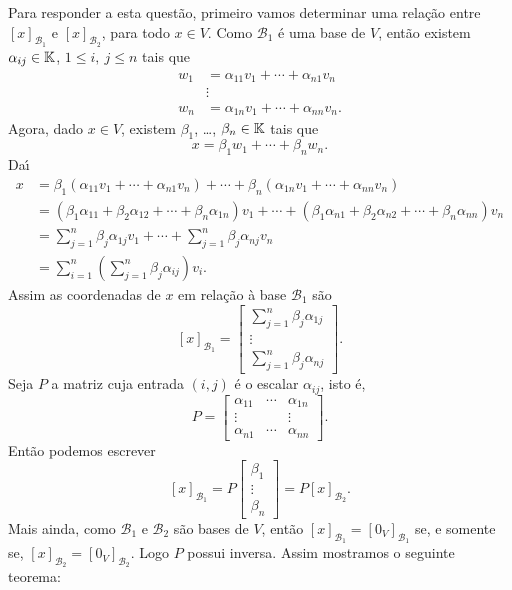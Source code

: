 Para responder a esta quest\~ao, primeiro vamos determinar uma rela\c{c}\~ao entre $[x]_{\mathcal{B}_1}$ e $[x]_{\mathcal{B}_2}$, para todo $x \in V$. Como $\mathcal{B}_1$ \'e uma base de $V$, ent\~ao existem $\alpha_{ij} \in \mathbb{K}$, $1 \le i,\ j \le n$ tais que
\begin{align*}
	w_1 &= \alpha_{11}v_1 + \cdots + \alpha_{n1}v_n\\
	&\vdots\\
	w_n &= \alpha_{1n}v_1 + \cdots + \alpha_{nn}v_n.
\end{align*}
Agora, dado $x \in V$, existem $\beta_1$, \dots, $\beta_n \in \mathbb{K}$ tais que
\[
	x = \beta_1w_1 + \cdots + \beta_nw_n.
\]
Da{\'\i}
\begin{align*}
	x &= \beta_1(\alpha_{11}v_1 + \cdots + \alpha_{n1}v_n) + \cdots + \beta_n(\alpha_{1n}v_1 + \cdots + \alpha_{nn}v_n)\\
	&= (\beta_1\alpha_{11} + \beta_2\alpha_{12} + \cdots + \beta_n\alpha_{1n})v_1 + \cdots + (\beta_1\alpha_{n1} + \beta_2\alpha_{n2} + \cdots + \beta_n\alpha_{nn})v_n\\
	&= \sum_{j=1}^n\beta_j\alpha_{1j}v_1 + \cdots + \sum_{j=1}^n\beta_j\alpha_{nj}v_n\\
	&= \sum_{i=1}^n\left(\sum_{j=1}^n\beta_j\alpha_{ij}\right)v_i.
\end{align*}
Assim as coordenadas de $x$ em rela\c{c}\~ao \`a base $\mathcal{B}_1$ s\~ao
\[
	[x]_{\mathcal{B}_1} = \begin{bmatrix}
		\sum_{j=1}^n\beta_j\alpha_{1j}\\
		\vdots\\
		\sum_{j=1}^n\beta_j\alpha_{nj}
	\end{bmatrix}.
\]
Seja $P$ a matriz cuja entrada $(i,j)$ \'e o escalar $\alpha_{ij}$, isto \'e,
\[
	P = \begin{bmatrix}
		\alpha_{11} & \cdots & \alpha_{1n}\\
		\vdots & & \vdots\\
		\alpha_{n1} & \cdots & \alpha_{nn}
	\end{bmatrix}.
\]
Ent\~ao podemos escrever
\[
	[x]_{\mathcal{B}_1} = P \begin{bmatrix}
		\beta_1\\
		\vdots\\
		\beta_n
	\end{bmatrix} = P[x]_{\mathcal{B}_2}.
\]
Mais ainda, como $\mathcal{B}_1$ e $\mathcal{B}_2$ s\~ao bases de $V$, ent\~ao $[x]_{\mathcal{B}_1} = [0_V]_{\mathcal{B}_1}$ se, e somente se, $[x]_{\mathcal{B}_2} = [0_V]_{\mathcal{B}_2}$. Logo $P$ possui inversa. Assim mostramos o seguinte teorema:

